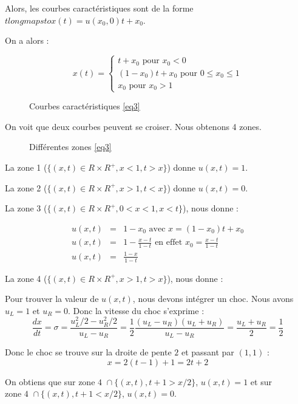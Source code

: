 \documentclass{article}
\begin{document}
Alors, les courbes caractéristiques sont de la forme $t longmapsto x(t) = u(x_0,0) t + x_0$.

On a alors :

\[
x(t) = \left\{ \begin{matrix}
	t + x_0 \text{ pour } x_0 < 0 \\
	(1-x_0) t + x_0 \text{ pour } 0 \leq x_0 \leq 1 \\
	x_0 \text{ pour } x_0 > 1
\end{matrix} \right. \]

\begin{figure}[h]
  
  \caption{Courbes caractéristiques \ref{eq3}}
\end{figure}

On voit que deux courbes peuvent se croiser. Nous obtenons 4 zones.

\begin{figure}[h]
  
  \caption{Différentes zones \ref{eq3}}
\end{figure}

La zone 1 ($\{(x,t) \in R \times R^{+}, x < 1, t > x\}$) donne $u(x,t) = 1$.

La zone 2 ($\{(x,t) \in R \times R^{+}, x > 1, t < x\}$) donne $u(x,t) = 0$.

La zone 3 ($\{(x,t) \in R \times R^{+}, 0 < x < 1, x < t \}$), nous donne :

\begin{eqnarray*}
	u(x,t) &=& 1 - x_0 \text{ avec } x = (1-x_0) t + x_0 \\
	u(x,t) &=& 1 - \frac{x-t}{1-t} \text{ en effet } x_0 = \frac{x-t}{1-t} \\
	u(x,t) &=& \frac{1-x}{1-t}  
\end{eqnarray*}

La zone 4 ($\{(x,t) \in R \times R^+, x > 1, t > x\}$), nous donne :

Pour trouver la valeur de $u(x,t)$, nous devons intégrer un choc. Nous avons $u_L=1$ et $u_R=0$. Donc la vitesse du choc s'exprime :
\[ \frac{dx}{dt} = \sigma = \frac{u_L^2/2 - u_R^2/2}{u_L - u_R} = \frac{1}{2} \frac{(u_L-u_R)(u_L+u_R)}{u_L-u_R} = \frac{u_L+u_R}{2} = \frac{1}{2} \]

Donc le choc se trouve sur la droite de pente $2$ et passant par $(1,1)$ :
\[ x = 2 (t - 1) + 1 = 2t + 2 \]

On obtiens que sur $\text{zone 4 } \cap \{(x,t), t+1 > x/2\}$, $u(x,t) = 1$ et sur $\text{zone 4 } \cap \{(x,t), t+1 < x/2\}$, $u(x,t) = 0$.
\newline
\end{document}
